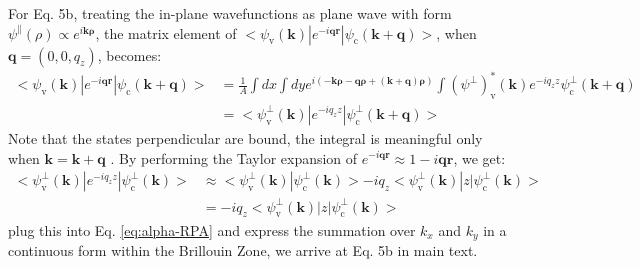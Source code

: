 \documentclass[manuscript=suppinfo,email=true,hyperref=true,keywords=false]{achemso}
\begin{document}
For Eq. 5b, treating the in-plane wavefunctions as plane wave with
form $\psi^{\parallel}(\rho) \propto e^{i \mathbf{k \rho}}$, the
matrix element of
$<\psi_{\mathrm{v}}(\mathbf{k})|e^{-i\mathbf{qr}}|\psi_{\mathrm{c}}(\mathbf{k+q})>$,
when $\mathbf{q}=(0, 0, q_{z})$, becomes\cite{Hybertsen_1987}:
\begin{equation}
  \begin{aligned}
    \label{eq:matrix-z}
  <\psi_{\mathrm{v}}(\mathbf{k})|e^{-i\mathbf{qr}}|\psi_{\mathrm{c}}(\mathbf{k+q})>
  &= \frac{1}{A} \int dx \int dy
  e^{i(\mathbf{-k \rho} - \mathbf{q \rho} + \mathbf{(k+q) \rho})}
  \int (\psi^{\perp})^{*}_{\mathrm{v}}(\mathbf{k})e^{-iq_{z}z}\psi^{\perp}_{\mathrm{c}}(\mathbf{k+q})\\
  &= <\psi^{\perp}_{\mathrm{v}}(\mathbf{k})|e^{-iq_{z}z}|\psi^{\perp}_{\mathrm{c}}(\mathbf{k+q})>
  \end{aligned}
\end{equation}
Note that the states perpendicular are bound, the integral is
meaningful only when $\mathbf{k=k+q}$ \cite{davies_physics_1997}. By
performing the Taylor expansion of
$e^{-i\mathbf{qr}} \approx 1 - i\mathbf{qr}$, we get:
\begin{equation}
  \begin{aligned}
    \label{eq:matrix-z}
    <\psi^{\perp}_{\mathrm{v}}(\mathbf{k})|e^{-iq_{z}z}|\psi^{\perp}_{\mathrm{c}}(\mathbf{k})>
    &\approx <\psi^{\perp}_{\mathrm{v}}(\mathbf{k})|\psi^{\perp}_{\mathrm{c}}(\mathbf{k})> -
    iq_{z} <\psi^{\perp}_{\mathrm{v}}(\mathbf{k})|z|\psi^{\perp}_{\mathrm{c}}(\mathbf{k})>\\
    &= -iq_{z} <\psi^{\perp}_{\mathrm{v}}(\mathbf{k})|z|\psi^{\perp}_{\mathrm{c}}(\mathbf{k})>
   \end{aligned}
\end{equation}
plug this into Eq. \ref{eq:alpha-RPA} and express the summation over
$k_{x}$ and $k_{y}$ in a continuous form within the Brillouin Zone, we
arrive at Eq. 5b in main text.
\end{document}
